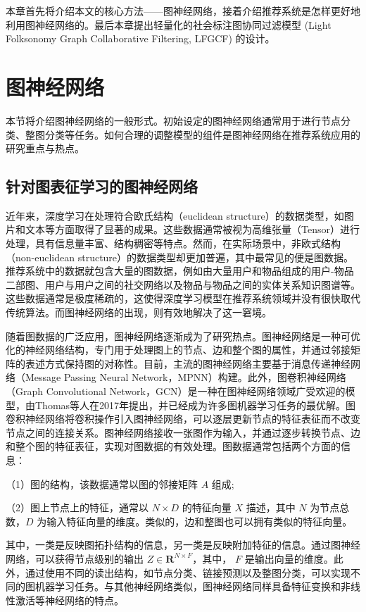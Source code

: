 本章首先将介绍本文的核心方法——图神经网络，接着介绍推荐系统是怎样更好地利用图神经网络的。最后本章提出轻量化的社会标注图协同过滤模型 (Light Folksonomy Graph Collaborative Filtering, LFGCF) 的设计。

\section{图神经网络}
本节将介绍图神经网络的一般形式。初始设定的图神经网络通常用于进行节点分类、整图分类等任务。如何合理的调整模型的组件是图神经网络在推荐系统应用的研究重点与热点。
\subsection{针对图表征学习的图神经网络}
近年来，深度学习在处理符合欧氏结构（euclidean structure）的数据类型，如图片和文本等方面取得了显著的成果。这些数据通常被视为高维张量（Tensor）进行处理，具有信息量丰富、结构稠密等特点。然而，在实际场景中，非欧式结构（non-euclidean structure）的数据类型却更加普遍，其中最常见的便是图数据。推荐系统中的数据就包含大量的图数据，例如由大量用户和物品组成的用户-物品二部图、用户与用户之间的社交网络以及物品与物品之间的实体关系知识图谱等。这些数据通常是极度稀疏的，这使得深度学习模型在推荐系统领域并没有很快取代传统算法。而图神经网络的出现，则有效地解决了这一窘境\cite{wu_survey_2022}。

随着图数据的广泛应用，图神经网络逐渐成为了研究热点。图神经网络是一种可优化的神经网络结构，专门用于处理图上的节点、边和整个图的属性，并通过邻接矩阵的表述方式保持图的对称性。目前，主流的图神经网络主要基于消息传递神经网络（Message Passing Neural Network，MPNN）构建\cite{battaglia_relational_2018}。此外，图卷积神经网络（Graph Convolutional Network，GCN）是一种在图神经网络领域广受欢迎的模型，由Thomas等人在2017年提出\cite{kipf_gcn_2017}，并已经成为许多图机器学习任务的最优解。图卷积神经网络将卷积操作引入图神经网络，可以逐层更新节点的特征表征而不改变节点之间的连接关系。图神经网络接收一张图作为输入，并通过逐步转换节点、边和整个图的特征表征，实现对图数据的有效处理。图数据通常包括两个方面的信息：

（1）图的结构，该数据通常以图的邻接矩阵 $A$ 组成;

（2）图上节点上的特征，通常以 $N \times D$ 的特征向量 $X$ 描述，其中 $N$ 为节点总数，$D$ 为输入特征向量的维度。类似的，边和整图也可以拥有类似的特征向量。

其中，一类是反映图拓扑结构的信息，另一类是反映附加特征的信息。通过图神经网络，可以获得节点级别的输出 $Z \in \mathbf{R}^{N\times F}$，其中， $F$ 是输出向量的维度。此外，通过使用不同的读出结构，如节点分类、链接预测以及整图分类，可以实现不同的图机器学习任务。与其他神经网络类似，图神经网络同样具备特征变换和非线性激活等神经网络的特点。

